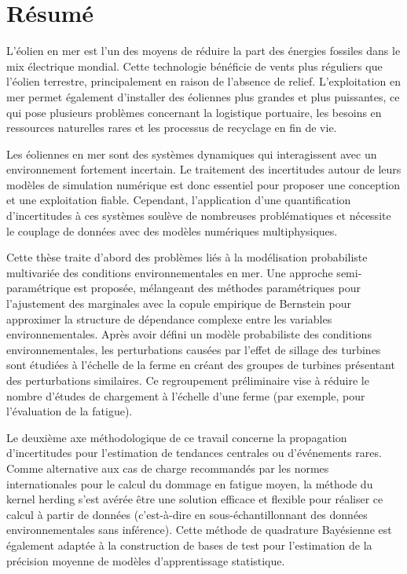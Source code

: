 \cleardoublepage
\setsinglecolumn
\chapter*{\centering \Large R\'{e}sum\'{e}}
\thispagestyle{empty}

{
\footnotesize
L'\'{e}olien en mer est l'un des moyens de r\'{e}duire la part des \'{e}nergies fossiles dans le mix \'{e}lectrique mondial. 
Cette technologie b\'{e}n\'{e}ficie de vents plus r\'{e}guliers que l'\'{e}olien terrestre, principalement en raison de l'absence de relief. 
L'exploitation en mer permet \'{e}galement d'installer des \'{e}oliennes plus grandes et plus puissantes, ce qui pose plusieurs problèmes concernant la logistique portuaire, les besoins en ressources naturelles rares et les processus de recyclage en fin de vie.

Les \'{e}oliennes en mer sont des systèmes dynamiques qui interagissent avec un environnement fortement incertain. 
Le traitement des incertitudes autour de leurs modèles de simulation num\'{e}rique est donc essentiel pour proposer une conception et une exploitation fiable. 
Cependant, l'application d'une quantification d'incertitudes à ces systèmes soulève de nombreuses probl\'{e}matiques et n\'{e}cessite le couplage de donn\'{e}es avec des modèles num\'{e}riques multiphysiques.

Cette thèse traite d'abord des problèmes li\'{e}s à la mod\'{e}lisation probabiliste multivari\'{e}e des conditions environnementales en mer. 
Une approche semi-param\'{e}trique est propos\'{e}e, m\'{e}langeant des m\'{e}thodes param\'{e}triques pour l'ajustement des marginales avec la copule empirique de Bernstein pour approximer la structure de d\'{e}pendance complexe entre les variables environnementales. 
Après avoir d\'{e}fini un modèle probabiliste des conditions environnementales, les perturbations caus\'{e}es par l'effet de sillage des turbines sont \'{e}tudi\'{e}es à l'\'{e}chelle de la ferme en cr\'{e}ant des groupes de turbines pr\'{e}sentant des perturbations similaires. 
Ce regroupement pr\'{e}liminaire vise à r\'{e}duire le nombre d'\'{e}tudes de chargement à l'\'{e}chelle d'une ferme (par exemple, pour l'\'{e}valuation de la fatigue).

Le deuxième axe m\'{e}thodologique de ce travail concerne la propagation d'incertitudes pour l'estimation de tendances centrales ou d'\'{e}v\'{e}nements rares. 
Comme alternative aux cas de charge recommand\'{e}s par les normes internationales pour le calcul du dommage en fatigue moyen, la m\'{e}thode du kernel herding s'est av\'{e}r\'{e}e être une solution efficace et flexible pour r\'{e}aliser ce calcul à partir de donn\'{e}es (c'est-à-dire en sous-\'{e}chantillonnant des donn\'{e}es environnementales sans inf\'{e}rence). 
Cette m\'{e}thode de quadrature Bay\'{e}sienne est \'{e}galement adapt\'{e}e à la construction de bases de test pour l'estimation de la pr\'{e}cision moyenne de modèles d'apprentissage statistique.

}
